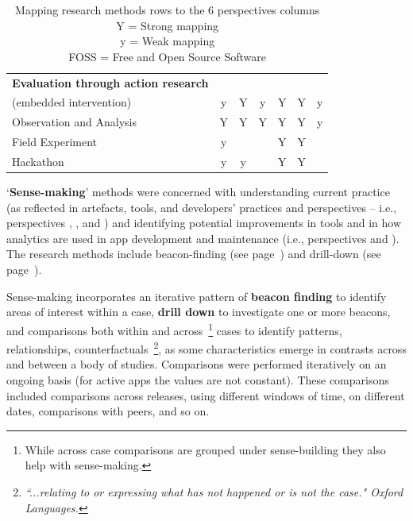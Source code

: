 \begin{table}
\begin{tabular}{l|ccc|ccc}
        \hline
        \textbf{Evaluation through action research} & & & & & & \\
        (embedded intervention)  &y &Y &y &Y &Y &y \\
        Observation and Analysis &Y &Y &Y &Y &Y &y \\
        Field Experiment         &y &  &  &Y &Y &  \\
        Hackathon                &y &y &  &Y &Y &  \\
        
        \bottomrule
    \end{tabular}
    \caption[Mapping research methods rows to the 6 perspectives columns]{Mapping research methods rows to the 6 perspectives columns \\ Y = Strong mapping \\ y = Weak mapping \\FOSS = Free and Open Source Software}
    \label{tab:mapping-analysis-to-six-perspectives}
\end{table}


`\textbf{Sense-making}' methods were concerned with understanding current practice (as reflected in artefacts, tools, and developers' practices and perspectives -- i.e., perspectives \uartefacts, \utools, and \uuse) and identifying potential improvements in tools and in how analytics are used in app development and maintenance (i.e., perspectives \itools and \iartefacts). The research methods include beacon-finding (see page~\pageref{section-beacon-finding-method}) and drill-down (see page~\pageref{drill-down-research-method}).

Sense-making incorporates an iterative pattern of \textbf{beacon finding} to identify areas of interest within a case, \textbf{drill down} to investigate one or more beacons, and comparisons both within and across~\footnote{While across case comparisons are grouped under sense-building they also help with sense-making.} cases to identify patterns, relationships, counterfactuals~\footnote{\emph{``...relating to or expressing what has not happened or is not the case." Oxford Languages.}}, as some characteristics emerge in contrasts across and between a body of studies. 
%
Comparisons were performed iteratively on an ongoing basis (for active apps the values are not constant). These comparisons included comparisons across releases, using different windows of time, on different dates, comparisons with peers, and so on.


